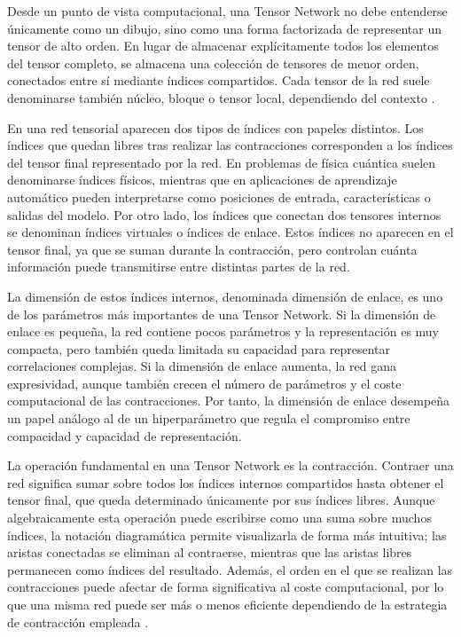 Desde un punto de vista computacional, una Tensor Network no debe entenderse únicamente como un dibujo, sino como una forma factorizada de representar un tensor de alto orden. En lugar de almacenar explícitamente todos los elementos del tensor completo, se almacena una colección de tensores de menor orden, conectados entre sí mediante índices compartidos. Cada tensor de la red suele denominarse también núcleo, bloque o tensor local, dependiendo del contexto .

En una red tensorial aparecen dos tipos de índices con papeles distintos. Los índices que quedan libres tras realizar las contracciones corresponden a los índices del tensor final representado por la red. En problemas de física cuántica suelen denominarse índices físicos, mientras que en aplicaciones de aprendizaje automático pueden interpretarse como posiciones de entrada, características o salidas del modelo. Por otro lado, los índices que conectan dos tensores internos se denominan índices virtuales o índices de enlace. Estos índices no aparecen en el tensor final, ya que se suman durante la contracción, pero controlan cuánta información puede transmitirse entre distintas partes de la red.

La dimensión de estos índices internos, denominada dimensión de enlace, es uno de los parámetros más importantes de una Tensor Network. Si la dimensión de enlace es pequeña, la red contiene pocos parámetros y la representación es muy compacta, pero también queda limitada su capacidad para representar correlaciones complejas. Si la dimensión de enlace aumenta, la red gana expresividad, aunque también crecen el número de parámetros y el coste computacional de las contracciones. Por tanto, la dimensión de enlace desempeña un papel análogo al de un hiperparámetro que regula el compromiso entre compacidad y capacidad de representación.

La operación fundamental en una Tensor Network es la contracción. Contraer una red significa sumar sobre todos los índices internos compartidos hasta obtener el tensor final, que queda determinado únicamente por sus índices libres. Aunque algebraicamente esta operación puede escribirse como una suma sobre muchos índices, la notación diagramática permite visualizarla de forma más intuitiva; las aristas conectadas se eliminan al contraerse, mientras que las aristas libres permanecen como índices del resultado. Además, el orden en el que se realizan las contracciones puede afectar de forma significativa al coste computacional, por lo que una misma red puede ser más o menos eficiente dependiendo de la estrategia de contracción empleada .

